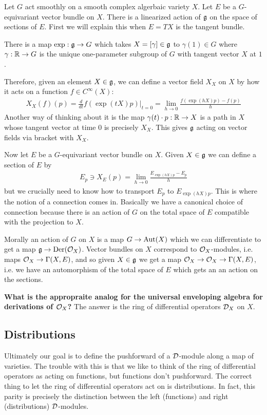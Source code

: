 Let $G$ act smoothly on a smooth complex algerbaic variety $X$. Let $E$ be a $G$-equivariant vector bundle on $X$.
There is a linearized action of $\mathfrak{g}$ on the space of sections of $E$. First we will explain this when $E = TX$ is the tangent bundle.

\begin{theorem}
	There is a map $\exp:\mathfrak{g} \to G$ which takes $X = [\gamma] \in \mathfrak{g}$ to $\gamma(1) \in G$ where $\gamma:\mathbb{R} \to G$ is the unique one-parameter subgroup of $G$ with tangent vector $X$ at $1$.
\end{theorem}
Therefore, given an element $X \in \mathfrak{g}$, we can define a vector field $X_X$ on $X$ by
how it acts on a function $f\in C^\infty(X)$:
\begin{align*}
	X_X(f)(p) = \frac{d}{dt} f(\exp(tX)p)|_{t=0} = \lim_{h\to 0} \frac{f(\exp(hX)p) - f(p)}{h}
\end{align*}
Another way of thinking about it is the map $\gamma(t)\cdot p:\mathbb{R}\to X$ is a path in $X$ whose tangent vector at time $0$ is precisely $X_X$.
This gives $\mathfrak{g}$ acting on vector fields via bracket with $X_X$.

\hfill

Now let $E$ be a $G$-equivariant vector bundle on $X$. Given
$X\in \mathfrak{g}$ we can define a section of $E$ by
\begin{align*}
	E_p \ni X_E(p) = \lim_{h\to 0} \frac{E_{\exp(hX)p} - E_p}{h}
\end{align*} but we crucially need to know how to transport $E_p$ to $E_{\exp(hX)p}$.
This is where the notion of a connection comes in. Basically we have a canonical choice of
connection because there is an action of $G$ on the total space of $E$ compatible with the projection to $X$.

\hfill

Morally an action of $G$ on $X$ is a map $G\to \operatorname{Aut}(X)$ which we can differentiate to get a map
$\mathfrak{g} \to \operatorname{Der}({\mathcal{O}}_X)$. Vector bundles on $X$ correspond to ${\mathcal{O}}_X$-modules, i.e. maps ${\mathcal{O}}_X
	\to \Gamma(X,E)$, and so given $X\in \mathfrak{g}$ we get a map ${\mathcal{O}}_X\to {\mathcal{O}}_X \to \Gamma(X,E)$, i.e.
we have an automorphism of the total space of $E$ which gets an an action on the sections.

\hfill

\textbf{What is the appropraite analog for the universal enveloping algebra for derivations of ${\mathcal{O}}_X$?}
The answer is the ring of differential operators ${\mathcal{D}}_X$ on $X$.

\subsection{Distributions}
Ultimately our goal is to define the pushforward of a ${\mathcal{D}}$-module along a map of varieties.
The trouble with this is that we like to think of the
ring of differential operators as acting on functions, but functions don't pushforward. The correct
thing to let the ring of differential operators act on is distributions. In fact,
this parity is precisely the distinction between the left (functions) and right (distributions) ${\mathcal{D}}$-modules.


